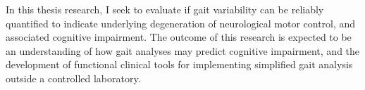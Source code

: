 \documentclass[11pt, oneside]{report}
\begin{document}
In this thesis research, I seek to evaluate if gait variability can be reliably quantified to indicate underlying degeneration of neurological motor control, and associated cognitive impairment. The outcome of this research is expected to be an understanding of how gait analyses may predict cognitive impairment, and the development of functional clinical tools for implementing simplified gait analysis outside a controlled laboratory.


\pagebreak

\end{document}
